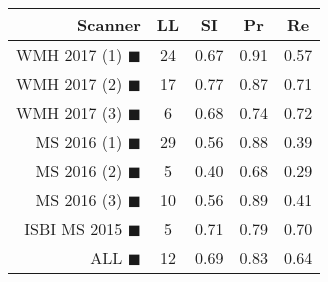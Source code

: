 \begin{tabular}{rcccc}
\toprule
Scanner & LL & SI & Pr & Re \\
\midrule
WMH 2017 (1) {\color[rgb]{ 1.00 0.00 0.00}$\blacksquare$} & 24 & 0.67 & 0.91 & 0.57 \\
WMH 2017 (2) {\color[rgb]{ 1.00 0.50 0.00}$\blacksquare$} & 17 & 0.77 & 0.87 & 0.71 \\
WMH 2017 (3) {\color[rgb]{ 1.00 0.80 0.00}$\blacksquare$} & 6 & 0.68 & 0.74 & 0.72 \\
MS  2016 (1) {\color[rgb]{ 0.20 0.80 0.00}$\blacksquare$} & 29 & 0.56 & 0.88 & 0.39 \\
MS  2016 (2) {\color[rgb]{ 0.00 0.40 1.00}$\blacksquare$} & 5 & 0.40 & 0.68 & 0.29 \\
MS  2016 (3) {\color[rgb]{ 0.60 0.00 1.00}$\blacksquare$} & 10 & 0.56 & 0.89 & 0.41 \\
ISBI MS 2015 {\color[rgb]{ 1.00 0.00 1.00}$\blacksquare$} & 5 & 0.71 & 0.79 & 0.70 \\
\midrule
ALL {\color[rgb]{ 1.00 1.00 1.00}$\blacksquare$} & 12 & 0.69 & 0.83 & 0.64 \\
\bottomrule
\end{tabular}